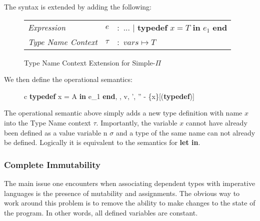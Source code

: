\documentclass[a4paper,12pt]{report}
\begin{document}
\par
The syntax is extended by adding the following: 
\begin{figure}[H]
  \begin{center}
    \begin{tabular} {l l l}
      \textit{Expression} & $e$ & $:$ ... $|$ \textbf{typedef }$x = T\textbf{ in } e_1$ \textbf{ end} \\
      \textit{Type Name Context} & $\tau$& $:$ $vars \mapsto T$ \\
    \end{tabular}
  \end{center}
  \caption{Type Name Context Extension for Simple-$\Pi$}
\end{figure}

\par
We then define the operational semantics: 

\begin{figure}[H]
  \begin{center}
    \begin{tabular} {c}
      {\langle \textbf{typedef }x = A \textbf{ in }e_1\textbf{ end}, 
      \sigma, \tau \rangle \longrightarrow 
        \langle v, \sigma', \tau'' - \{x\}\rangle}[(\textbf{typedef})] \text{ }    
    \end{tabular}
  \end{center}
\end{figure}

\par
The operational semantic above simply adds a new type definition with name $x$ 
into the Type Name context $\tau$. Importantly, the variable $x$ cannot have 
already been defined as a value variable n $\sigma$ and a type of the same name 
can not already be defined. Logically it is equivalent to the semantics for 
\textbf{let in}.


\subsubsection{Complete Immutability}
The main issue one encounters when associating dependent types with imperative 
languages is the presence of mutability and assignments. The obvious way to 
work around this problem is to remove the ability to make changes to the state 
of the program. In other words, all defined variables are constant. 
\end{document}
